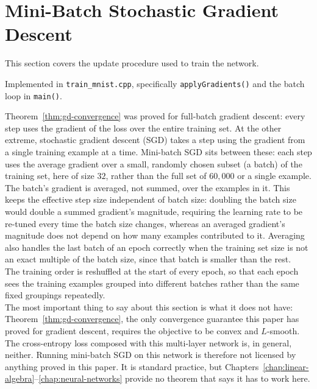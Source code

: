 \section{Mini-Batch Stochastic Gradient Descent}
\label{sec:mnist-sgd}
	
	This section covers the update procedure used to train the network.
	
	Implemented in \texttt{train\_mnist.cpp}, specifically \texttt{applyGradients()} and the batch loop in \texttt{main()}.
	
	Theorem~\ref{thm:gd-convergence} was proved for full-batch gradient descent: every step uses the gradient of the loss over the entire training set. At the other extreme, stochastic gradient descent (SGD) takes a step using the gradient from a single training example at a time. Mini-batch SGD sits between these: each step uses the average gradient over a small, randomly chosen subset (a batch) of the training set, here of size $32$, rather than the full set of $60{,}000$ or a single example. \\
	
	The batch's gradient is averaged, not summed, over the examples in it. This keeps the effective step size independent of batch size: doubling the batch size would double a summed gradient's magnitude, requiring the learning rate to be re-tuned every time the batch size changes, whereas an averaged gradient's magnitude does not depend on how many examples contributed to it. Averaging also handles the last batch of an epoch correctly when the training set size is not an exact multiple of the batch size, since that batch is smaller than the rest. \\
	
	The training order is reshuffled at the start of every epoch, so that each epoch sees the training examples grouped into different batches rather than the same fixed groupings repeatedly. \\
	
	The most important thing to say about this section is what it does not have: Theorem~\ref{thm:gd-convergence}, the only convergence guarantee this paper has proved for gradient descent, requires the objective to be convex and $L$-smooth. The cross-entropy loss composed with this multi-layer network is, in general, neither. Running mini-batch SGD on this network is therefore not licensed by anything proved in this paper. It is standard practice, but Chapters~\ref{chap:linear-algebra}--\ref{chap:neural-networks} provide no theorem that says it has to work here.
	
